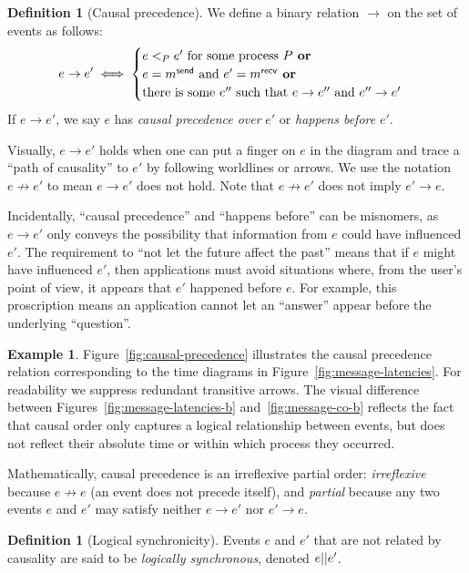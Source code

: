 \documentclass[]             %
{NASA}                       %
\theoremstyle{definition}
\newtheorem{example}[theorem]{Example}
\newtheorem{definition}[theorem]{Definition}
\begin{document}
\begin{definition}[Causal precedence]
  \label{def:causalprecedence}
  We define a binary relation $\to$ on the set of events as follows:
  \[e \to e' \iff
  \begin{cases}
    e <_{P} e' \textrm{ for some process $P$}
    \textbf{ or} \\
    e = m_{}^{\mathsf{send}} \textrm{ and } e' =m_{}^{\mathsf{recv}}
    \textbf{ or} \\
    \textrm{there is some } e'' \textrm{ such that } e \to e'' \textrm{ and } e'' \to e'
  \end{cases}
  \]
  If $e \to e'$, we say $e$ has \emph{causal precedence over} $e'$ or
  \emph{happens before} $e'$.
\end{definition}
Visually, $e \to e'$ holds when one can put a finger on $e$ in the
diagram and trace a ``path of causality'' to $e'$ by following
worldlines or arrows. We use the notation $e \not \to e'$ to mean
$e \to e'$ does not hold. Note that $e \not \to e'$ does not imply
$e' \to e$.

Incidentally, ``causal precedence'' and ``happens before'' can be
misnomers, as $e \to e'$ only conveys the possibility that information
from $e$ could have influenced $e'$. The requirement to ``not let the
future affect the past'' means that if $e$ might have influenced $e'$,
then applications must avoid situations where, from the user's point
of view, it appears that $e'$ happened before $e$. For example, this
proscription means an application cannot let an ``answer'' appear
before the underlying ``question''.

\begin{example}
  Figure~\ref{fig:causal-precedence} illustrates the causal precedence
  relation corresponding to the time diagrams in
  Figure~\ref{fig:message-latencies}. For readability we suppress
  redundant transitive arrows. The visual difference between
  Figures~\ref{fig:message-latencies-b} and~\ref{fig:message-co-b}
  reflects the fact that causal order only captures a logical
  relationship between events, but does not reflect their absolute
  time or within which process they occurred.
\end{example}

Mathematically, causal precedence is an irreflexive partial order:
\emph{irreflexive} because $e \not \to e$ (an event does not precede
itself), and \emph{partial} because any two events $e$ and $e'$ may
satisfy neither $e \to e'$ nor $e' \to e$.

\begin{definition}[Logical synchronicity]
  \label{def:logically-synchronous}
  Events $e$ and $e'$ that are not related by causality are said to be
  \emph{logically synchronous}, denoted $e || e'$.
\end{definition}
\end{document}
